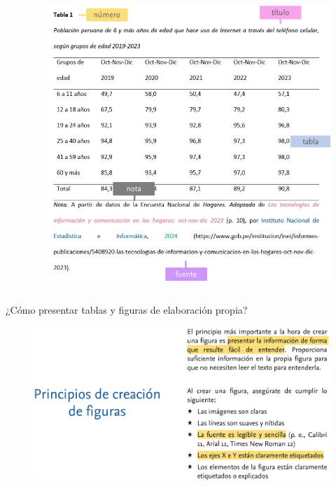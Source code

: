 \documentclass[
11pt, %
]{beamer}
\begin{document}
\begin{frame}
\begin{columns}[c]
\begin{column}{0.5\textwidth}
		\end{column}
		\begin{column}{0.5\textwidth} %
			\begin{figure}
				\centering
				\includegraphics[width=0.9\linewidth]{images/screenshot017}
			\end{figure}

		\end{column}
	\end{columns}

\end{frame}

\begin{frame}{¿Cómo presentar tablas y figuras de elaboración propia?}
	\begin{figure}
		\centering
		\includegraphics[width=1\linewidth]{images/screenshot019}
	\end{figure}

\end{frame}
\end{document}
